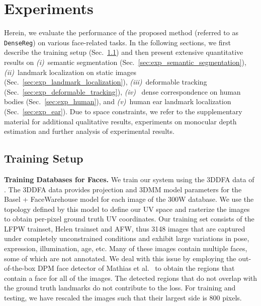 \section{Experiments}
\label{sec:experiments}
Herein, we evaluate the performance of the proposed method (referred to as \texttt{DenseReg}) on various face-related tasks. 
In the following sections, we first describe the training setup (Sec.~\ref{sec:training_setup}) and then present extensive quantitative results on \emph{(i)}~semantic segmentation (Sec.~\ref{sec:exp_semantic_segmentation}), \emph{(ii)}~landmark localization on static images (Sec.~\ref{sec:exp_landmark_localization}), \emph{(iii)}~deformable tracking (Sec.~\ref{sec:exp_deformable_tracking}), \emph{(iv)}~ dense correspondence on human bodies (Sec.~\ref{sec:exp_human}), and \emph{(v)}~human ear landmark localization (Sec.~\ref{sec:exp_ear}).
Due to space constraints, we refer to the supplementary material for additional qualitative results, experiments on monocular depth estimation and further analysis of experimental results.


\subsection{Training Setup}
\label{sec:training_setup}

\textbf{Training Databases for Faces.} We train our system using the 3DDFA data of \citep{zhu2016face}. The 3DDFA data provides projection and 3DMM model parameters for the Basel \citep{paysan20093d} + FaceWarehouse \citep{cao2014facewarehouse} model for each image of the 300W database. We use the topology defined by this model to define our UV space and rasterize the images to obtain per-pixel ground truth UV coordinates.  Our training set consists of the LFPW trainset, Helen trainset and AFW, thus 3148 images
that are captured under completely unconstrained conditions
and exhibit large variations in pose, expression, illumination,
age, etc.
 Many of these images contain multiple faces, some of which are not annotated. We deal with this issue by employing the out-of-the-box DPM face detector of Mathias et al.~\citep{mathias2014face} to obtain the regions that contain a face for all of the images. The detected regions that do not overlap with the ground truth landmarks do not contribute to the loss. For training and testing, we have rescaled the images such that their largest side is 800 pixels.
 
